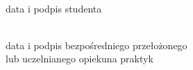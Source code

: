 \documentclass[11pt,a4paper]{article}
\begin{document}
\vspace{10em}

\noindent
\begin{minipage}[t]{0.45\textwidth}
\centering
\dotfill \\
\small data i podpis studenta
\end{minipage}
\hfill
\begin{minipage}[t]{0.45\textwidth}
\centering
\dotfill \\
\small data i podpis bezpośredniego przełożonego \\
\small lub uczelnianego opiekuna praktyk
\end{minipage}
\end{document}
